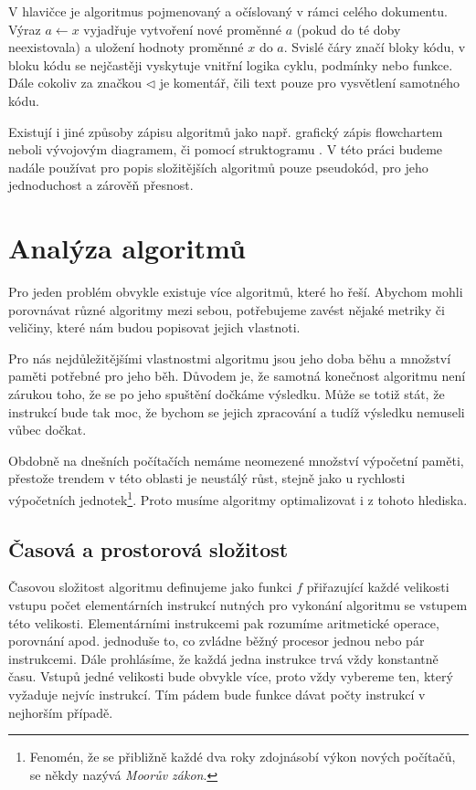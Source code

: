\documentclass[12pt]{report}			%
\begin{document}
				V hlavičce je algoritmus pojmenovaný a očíslovaný v rámci celého dokumentu. Výraz $a \gets x$ vyjadřuje vytvoření nové proměnné $a$ (pokud do té doby neexistovala) a uložení hodnoty proměnné $x$ do $a$. Svislé čáry značí bloky kódu, v bloku kódu se nejčastěji vyskytuje vnitřní logika cyklu, podmínky nebo funkce. Dále cokoliv za značkou $\lhd$ je komentář, čili text pouze pro vysvětlení samotného kódu.				
				

				Existují i jiné způsoby zápisu algoritmů jako např. grafický zápis flowchartem neboli vývojovým diagramem, či pomocí struktogramu \cite{zaklady}. V této práci budeme nadále používat pro popis složitějších algoritmů pouze pseudokód, pro jeho jednoduchost a zárověň přesnost.
				
					
			
		
		\chapter{Analýza algoritmů}
		Pro jeden problém obvykle existuje více algoritmů, které ho řeší. Abychom mohli porovnávat různé algoritmy mezi sebou, potřebujeme  zavést nějaké metriky či veličiny, které nám budou popisovat jejich vlastnoti. 
		
		Pro nás nejdůležitějšími vlastnostmi algoritmu jsou jeho doba běhu a množství paměti potřebné pro jeho běh. Důvodem je, že samotná konečnost algoritmu není zárukou toho, že se po jeho spuštění dočkáme výsledku. Může se totiž stát, že instrukcí bude tak moc, že bychom se jejich zpracování a tudíž výsledku nemuseli vůbec dočkat.
		
		Obdobně na dnešních počítačích nemáme neomezené množství výpočetní paměti, přestože trendem v této oblasti je neustálý růst, stejně jako u rychlosti výpočetních jednotek\footnote{Fenomén, že se přibližně každé dva roky zdojnásobí výkon nových počítačů, se někdy nazývá \emph{Moorův zákon}.}. Proto musíme algoritmy optimalizovat i z tohoto hlediska. \cite{cerny}
		
		
			\section{Časová a  prostorová složitost}
			
			Časovou složitost algoritmu definujeme jako funkci $f$ přiřazující každé velikosti vstupu počet elementárních instrukcí nutných pro vykonání algoritmu se vstupem této velikosti. Elementárními instrukcemi pak rozumíme aritmetické operace, porovnání apod. jednoduše to, co zvládne běžný procesor jednou nebo pár instrukcemi. 
			Dále prohlásíme, že každá jedna instrukce trvá vždy konstantně času. Vstupů jedné velikosti bude obvykle více, proto vždy vybereme ten, který vyžaduje nejvíc instrukcí. Tím pádem bude funkce dávat počty instrukcí v nejhorším případě.
			
\end{document}
